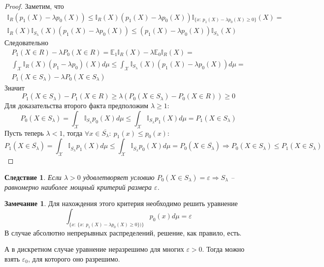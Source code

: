 \documentclass[a4paper,12pt]{article}
\renewcommand{\leq}{\ensuremath{\leqslant}}
\renewcommand{\geq}{\ensuremath{\geqslant}}
\theoremstyle{plain}
\newtheorem*{corollary}{Следствие}
\theoremstyle{definition}
\newtheorem*{note}{Замечание}
\theoremstyle{remark}
\begin{document}
\begin{proof}
  Заметим, что
  \begin{align*}
    \mathbb{I}_R(p_1(X) - \lambda p_0(X)) \leq \mathbb{I}_R(X)(p_1(X) - \lambda p_0(X))\mathbb{I}_{\{x :\: p_1(X) - \lambda p_0(X) \geq 0\}}(X) =\\
    \mathbb{I}_R(X)\mathbb{I}_{S_\lambda}(X)(p_1(X) - \lambda p_0(X)) \leq (p_1(X) - \lambda p_0(X))\mathbb{I}_{S_\lambda}(X)
  \end{align*}
  Следовательно
  \begin{align*}
    P_1(X \in R) - \lambda P_0(X \in R) = \mathbb{E}_1\mathbb{I}_R(X) - \lambda\mathbb{E}_0\mathbb{I}_R(X) =\\
    \int_\mathcal{X}\mathbb{I}_R(X)(p_1 - \lambda p_0)(X)d\mu \leq \int_\mathcal{X}\mathbb{I}_{S_\lambda}(X)(p_1(X) - \lambda p_0(X))d\mu =\\
    P_1(X \in S_\lambda) - \lambda P_0(X \in S_\lambda)
  \end{align*}
  Значит
  \[
    P_1(X \in S_\lambda) - P_1(X \in R) \geq \lambda(P_0(X \in S_\lambda) - P_0(X \in R)) \geq 0
  \]
  Для доказательства второго факта предположим $\lambda \geq 1$:
  \[
    P_0(X \in S_\lambda) = \int_\mathcal{X}\mathbb{I}_{S_\lambda}p_0(X)d\mu \leq \int_\mathcal{X}\mathbb{I}_{S_\lambda}p_1(X)d\mu = P_1(X \in S_\lambda)
  \]
  Пусть теперь $\lambda < 1$, тогда $\forall x \in \overline{S_\lambda} :\: p_1(x) \leq p_0(x)$:
  \[
    P_1(X \in \overline{S_\lambda}) = \int_\mathcal{X}\mathbb{I}_{\overline{S_\lambda}}p_1(X)d\mu \leq \int_\mathcal{X}\mathbb{I}_{\overline{S_\lambda}}p_0(X)d\mu = P_0(X \in \overline{S_\lambda}) \Rightarrow P_0(X \in S_\lambda) \leq P_1(X \in S_\lambda)
  \]
\end{proof}

\begin{corollary}
  Если $\lambda > 0$ удовлетворяет условию $P_0(X \in S_\lambda) = \varepsilon \Rightarrow S_\lambda$ -- равномерно наиболее мощный критерий размера $\varepsilon$.
\end{corollary}

\begin{note}
  Для нахождения этого критерия необходимо решить уравнение
  \[
    \int_{\{x :\: \{x :\: p_1(X) - \lambda p_0(X) \geq 0\})\}}p_0(x)d\mu = \varepsilon
  \]
  В случае абсолютно непрерывных распределений, решение, как правило, есть.

  А в дискретном случае уравнение неразрешимо для многих $\varepsilon > 0$. Тогда можно взять $\varepsilon_0$, для которого оно разрешимо.
\end{note}
\end{document}
